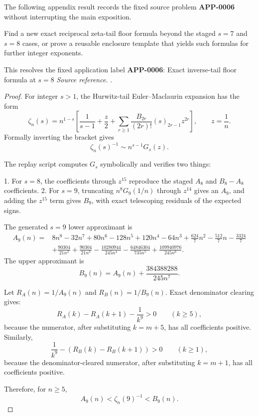 The following appendix result records the fixed source problem \textbf{APP-0006} without interrupting the main exposition.
\begin{corollary}[APP-0006: Exact inverse-tail floor formula at s=8]
\label{res:zeta-tail-floor-next-case}
Find a new exact reciprocal zeta-tail floor formula beyond the staged \(s=7\) and \(s=8\) cases, or prove a reusable enclosure template that yields such formulas for further integer exponents.

This resolves the fixed application label \textbf{APP-0006}: Exact inverse-tail floor formula at \(s=8\)
\emph{Source reference.} \cite{app-app-0006-source}.
\end{corollary}
\begin{proof}
For integer \(s>1\), the Hurwitz-tail Euler--Maclaurin expansion has the form
\[
\zeta_n(s)
=n^{1-s}\left[
\frac1{s-1}+\frac{z}{2}
+\sum_{r\ge1}\frac{B_{2r}}{(2r)!}(s)_{2r-1}z^{2r}
\right],
\qquad z=\frac1n.
\]
Formally inverting the bracket gives
\[
\zeta_n(s)^{-1}\sim n^{s-1}G_s(z).
\]

The replay script
computes \(G_s\) symbolically and verifies two things:

1. For \(s=8\), the coefficients through \(z^{15}\) reproduce the staged \(A_8\) and \(B_8-A_8\) coefficients.
2. For \(s=9\), truncating \(n^8G_9(1/n)\) through \(z^{14}\) gives an \(A_9\), and adding the \(z^{15}\) term gives \(B_9\), with exact telescoping residuals of the expected signs.

The generated \(s=9\) lower approximant is
\[
\begin{aligned}
A_9(n)=&8n^8-32n^7+80n^6-128n^5+120n^4-64n^3
+\frac{624}{7}n^2-\frac{512}{7}n-\frac{3324}{7}\\
&+\frac{90304}{21n^2}+\frac{90304}{21n^3}
-\frac{10280944}{245n^4}-\frac{64846304}{735n^5}
+\frac{109940976}{245n^6}.
\end{aligned}
\]
The upper approximant is
\[
B_9(n)=A_9(n)+\frac{384388288}{245n^7}.
\]

Let \(R_A(n)=1/A_9(n)\) and \(R_B(n)=1/B_9(n)\). Exact denominator clearing gives:
\[
R_A(k)-R_A(k+1)-\frac1{k^9}>0
\qquad(k\ge5),
\]
because the numerator, after substituting \(k=m+5\), has all coefficients positive. Similarly,
\[
\frac1{k^9}-\left(R_B(k)-R_B(k+1)\right)>0
\qquad(k\ge1),
\]
because the denominator-cleared numerator, after substituting \(k=m+1\), has all coefficients positive.

Therefore, for \(n\ge5\),
\[
A_9(n)<\zeta_n(9)^{-1}<B_9(n).
\]


\end{proof}
